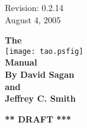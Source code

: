 \thispagestyle{empty}

\begin{flushright}
\large
  Revision: 0.2.14 \\
  August 4, 2005 \\
\end{flushright}

\vfill

{
\begin{center}
{\Huge \sf\bf The} \\
\vskip 0.1in
\texttt{[image: tao.psfig]} \\
\vskip 0.1in
{\Huge \sf\bf Manual} \\
\vskip 0.4in
{\Large \sf\bf By David Sagan \\ and \\ Jeffrey C. Smith} \\
\end{center}
}

\vskip 1in
\begin{center}
{\Huge \bf *** DRAFT ***}
\end{center}
\vfill
\break
